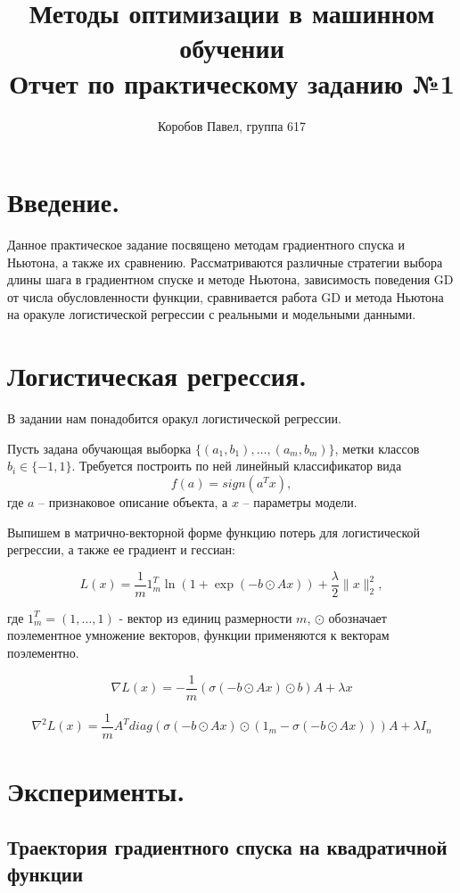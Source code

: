 \documentclass[11pt]{article}
\title{Методы оптимизации в машинном обучении \\
Отчет по практическому заданию №1}
\author{Коробов Павел, группа 617}
\begin{document}
\maketitle
\thispagestyle{empty}

\section{Введение.}
Данное практическое задание посвящено методам градиентного спуска и Ньютона, а также их сравнению. Рассматриваются различные стратегии выбора длины шага в градиентном спуске и методе Ньютона, зависимость поведения GD от числа обусловленности функции, сравнивается работа GD и метода Ньютона на оракуле логистической регрессии с реальными и модельными данными.
\section{Логистическая регрессия.}

\hspace{0.5cm} В задании нам понадобится оракул логистической регрессии. 

Пусть задана обучающая выборка $\{(a_1, b_1), \dots, (a_m, b_m)\}$, метки классов $b_i \in \{-1, 1\}$.
Требуется построить по ней линейный классификатор вида 
$$f(a) = sign(a^T x),$$ где $a$ -- признаковое описание объекта, а $x$ -- параметры модели.



Выпишем в матрично-векторной форме функцию потерь для логистической регрессии, а также ее градиент и гессиан:

$$L(x) = \frac1m 1_m^T 
				\ln(1 + \exp(-b \odot Ax)) 
				+ \frac{\lambda}2 \|{x}\|^2_2,$$

где $1_m^T = (1,\dots, 1)$ - вектор из единиц размерности $m$, $\odot$ обозначает поэлементное умножение векторов, функции применяются к векторам поэлементно.

$$\nabla L(x) = -\frac1m \left(\sigma(-b \odot Ax) \odot b \right)A + \lambda x$$

$$\nabla^2 L(x) = \frac1m A^{T} diag \left(\sigma(-b \odot Ax)\odot 
						        (1_m - \sigma(-b \odot Ax)) \right)A + \lambda I_n$$

\section{Эксперименты.}

\subsection{Траектория градиентного спуска на квадратичной функции}
\end{document}
